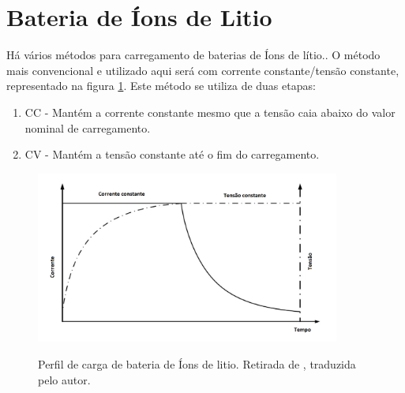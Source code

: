\section{Bateria de Íons de Litio}
\par Há vários métodos para carregamento de baterias de Íons de lítio.\cite{YONG2015365}. O método mais convencional e utilizado aqui será com corrente constante/tensão constante, representado na figura \ref{Figbatprofile}. Este método se utiliza de duas etapas: 
\begin{enumerate}
    \item CC - Mantém a corrente constante mesmo que a tensão caia abaixo do valor nominal de carregamento. 
    \item CV - Mantém a tensão constante até o fim do carregamento. 
\end{enumerate}

\begin{figure}[H]
\caption{Perfil de carga de bateria de Íons de litio. Retirada de \cite{YONG2015365}, traduzida pelo autor.}
 \centering %
\includegraphics[width=10cm]{figuras/BateriaProfile.png} 
\label{Figbatprofile}
\end{figure}
